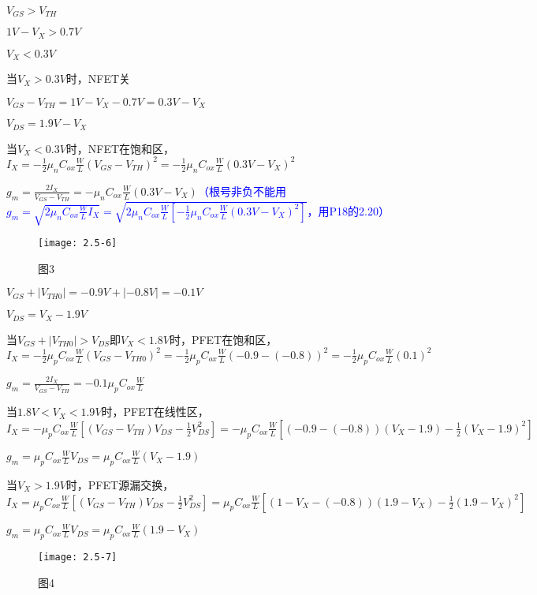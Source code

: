 {	\scalebox{3}{（c）}
	
	$V_{GS}>V_{TH}$
	
	$1V-V_{X}>0.7V$
	
	$V_{X}<0.3V$
	
	当$V_X>0.3V$时，NFET关
	
	$V_{GS}-V_{TH}=1V-V_{X}-0.7V=0.3V-V_{X}$
	
	$V_{DS}=1.9V-V_{X}$
	
	当$V_X<0.3V$时，NFET在饱和区，$I_X=-\frac{1}{2}\mu_nC_{ox}\frac{W}{L}(V_{GS}-V_{TH})^2=-\frac{1}{2}\mu_nC_{ox}\frac{W}{L}(0.3V-V_{X})^2$
	
	$g_m=\frac{2I_X}{V_{GS}-V_{TH}}=-\mu_nC_{ox}\frac{W}{L}(0.3V-V_{X})$\textcolor{blue}{（根号非负不能用$g_m=\sqrt{2\mu_nC_{ox}\frac{W}{L}I_X}=\sqrt{2\mu_nC_{ox}\frac{W}{L}[-\frac{1}{2}\mu_nC_{ox}\frac{W}{L}(0.3V-V_{X})^2]}$，用P18的2.20）}
	
				\begin{figure}[H] %
		\begin{minipage}{\linewidth}
			\texttt{[image: 2.5-6]}
		\end{minipage}
		\caption*{图3} %
	\end{figure}
	
	\scalebox{3}{（d）}
	
	$V_{GS}+|V_{TH0}|=-0.9V+|-0.8V|=-0.1V$
	
	$V_{DS}=V_{X}-1.9V$
	
	当$V_{GS}+|V_{TH0}|>V_{DS}\text{即}V_X<1.8V$时，PFET在饱和区，$I_X=-\frac{1}{2}\mu_pC_{ox}\frac{W}{L}(V_{GS}-V_{TH0})^2=-\frac{1}{2}\mu_pC_{ox}\frac{W}{L}(-0.9-(-0.8))^2=-\frac{1}{2}\mu_pC_{ox}\frac{W}{L}(0.1)^2$
	
	$g_m=\frac{2I_X}{V_{GS}-V_{TH}}=-0.1\mu_pC_{ox}\frac{W}{L}$
	
	当$1.8V<V_X<1.9V$时，PFET在线性区，$I_X=-\mu_pC_{ox}\frac{W}{L}[(V_{GS}-V_{TH})V_{DS}-\frac{1}{2}V_{DS}^2]=-\mu_pC_{ox}\frac{W}{L}[(-0.9-(-0.8))(V_{X}-1.9)-\frac{1}{2}(V_{X}-1.9)^2]$
	
	$g_m=\mu_pC_{ox}\frac{W}{L}V_{DS}=\mu_pC_{ox}\frac{W}{L}(V_{X}-1.9)$
	
	当$V_X>1.9V$时，PFET源漏交换，$I_X=\mu_pC_{ox}\frac{W}{L}[(V_{GS}-V_{TH})V_{DS}-\frac{1}{2}V_{DS}^2]=\mu_pC_{ox}\frac{W}{L}[(1-V_{X}-(-0.8))(1.9-V_{X})-\frac{1}{2}(1.9-V_{X})^2]$
	
	$g_m=\mu_pC_{ox}\frac{W}{L}V_{DS}=\mu_pC_{ox}\frac{W}{L}(1.9-V_{X})$
	
					\begin{figure}[H] %
		\begin{minipage}{\linewidth}
			\texttt{[image: 2.5-7]}
		\end{minipage}
		\caption*{图4} %
	\end{figure}
	
}
